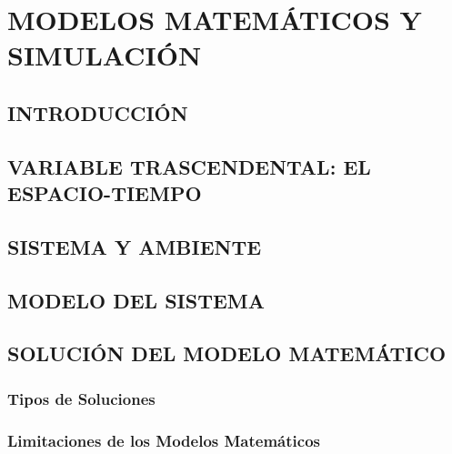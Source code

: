 
\chapter{MODELOS MATEMÁTICOS Y SIMULACIÓN}

\renewcommand{\thefootnote}{\arabic{footnote}}
\renewcommand{\theequation}{\arabic{chapter}-\arabic{equation}}
\renewcommand{\thefigure}{\arabic{chapter}.\arabic{figure}}
\renewcommand{\figurename}{Figura}
\renewcommand{\tablename}{\textbf{Tabla}}
\renewcommand{\thetable}{\textbf{\arabic{chapter}-\arabic{table}}}



\section{INTRODUCCIÓN}\label{sec:intro}
\setcounter{equation}{0}

\section{VARIABLE TRASCENDENTAL: EL ESPACIO-TIEMPO}\label{sec:varTrasc}

\section{SISTEMA Y AMBIENTE}\label{sec:sistAmbiente}

\section{MODELO DEL SISTEMA}\label{sec:modDelSistema}

\section{SOLUCIÓN DEL MODELO MATEMÁTICO}\label{sec:SolModeloMatematico}
\subsection{Tipos de Soluciones}\label{subsec:TiposDeSoldeModMat}
\subsection{Limitaciones de los Modelos Matemáticos}\label{subsec:LimitdeModMat}

